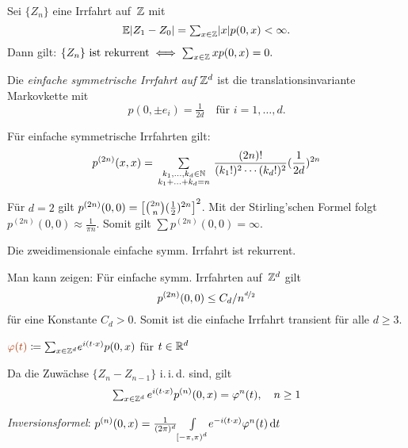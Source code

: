 \documentclass{cheat-sheet}
\newcommand{\E}{\mathbb{E}} %
\newcommand{\iid}{i.\,i.\,d.} %
\newcommand{\Defn}[1]{\textcolor{DefinitionColor}{#1}}
\begin{document}
\begin{satz}
  Sei $\{ Z_n \}$ eine Irrfahrt auf~$\mathbb{Z}$ mit
  \[ \E \abs{Z_1 - Z_0} = {\sum}_{x \in \Z} \abs{x} p(0, x) < \infty. \]
  Dann gilt: \quad
  $
    \{ Z_n \} \text{ ist rekurrent} \iff {\sum}_{x \in \Z} \, x p(0, x) = 0.
  $
\end{satz}

\begin{defn}
  Die \emph{einfache symmetrische Irrfahrt auf $\mathbb{Z}^d$} ist die translationsinvariante Markovkette mit
  \[
    p(0, \pm e_i) = \tfrac{1}{2 d} \quad \text{für } i = 1, \ldots, d.
  \]
\end{defn}

\begin{bem}
  Für einfache symmetrische Irrfahrten gilt:
  \[
    p^{(2n)}(x, x) = \qquad \sum_{\mathclap{\substack{k_1, \ldots, k_d \in \N \\ k_1 + \ldots + k_d = n}}} \qquad \frac{(2n)!}{(k_1!)^2 \cdots (k_d!)^2} (\frac{1}{2d})^{2n}
  \]

  Für $d = 2$ gilt $p^{(2n)}(0, 0) = \left[ \tbinom{2n}{n} (\tfrac{1}{2})^{2n} \right]^2$.
  Mit der Stirling'schen Formel folgt $p^{(2n)}(0, 0) \approx \tfrac{1}{\pi n}$.
  Somit gilt $\sum p^{(2n)}(0,0) = \infty$.
\end{bem}

\begin{fazit}
  Die zweidimensionale einfache symm. Irrfahrt ist rekurrent.
\end{fazit}


\begin{bem}
  Man kann zeigen:
  Für einfache symm. Irrfahrten auf~$\mathbb{Z}^d$ gilt
  \[ p^{(2n)}(0,0) \leq C_d / n^{\nicefrac{d}{2}} \]
  für eine Konstante $C_d > 0$.
  Somit ist die einfache Irrfahrt transient für alle $d \geq 3$.
\end{bem}

\begin{defn}
  $\Defn{\varphi(t)} \coloneqq {\sum}_{x \in \Z^d} e^{i (t \cdot x)} p(0, x)$ \quad
  für $t \in \mathbb{R}^d$
\end{defn}

\begin{bem}
  Da die Zuwächse $\{ Z_n - Z_{n-1} \}$ \iid{} sind, gilt
  \[ {\sum}_{x \in \Z^d} \, e^{i (t \cdot x)} p^{(n)}(0, x) = \varphi^n(t), \quad n \geq 1 \]

  \textit{Inversionsformel}: \quad
  $p^{(n)}(0, x) = \tfrac{1}{(2 \pi)^d} {\textstyle \int\limits_{\left[ -\pi, \pi \right)^d}^{}} e^{- i (t \cdot x)} \varphi^n(t) \,\mathrm{d} t$
\end{bem}
\end{document}
